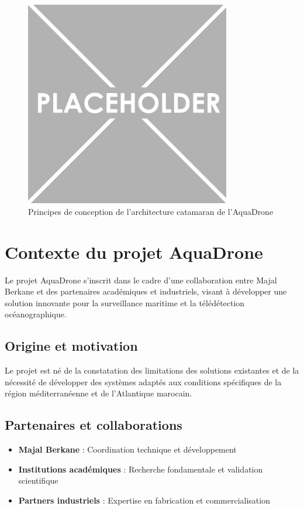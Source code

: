 {%
\begin{figure}[h]
    \centering
    \includegraphics[width=0.8\textwidth]{Figures/PezizaTuberosa.jpg}
    \caption{Principes de conception de l'architecture catamaran de l'AquaDrone}
    \label{fig:catamaran-design}
\end{figure}

\section{Contexte du projet AquaDrone}
Le projet AquaDrone s'inscrit dans le cadre d'une collaboration entre Majal Berkane et des partenaires académiques et industriels, visant à développer une solution innovante pour la surveillance maritime et la télédétection océanographique.

\subsection{Origine et motivation}
Le projet est né de la constatation des limitations des solutions existantes et de la nécessité de développer des systèmes adaptés aux conditions spécifiques de la région méditerranéenne et de l'Atlantique marocain.

\subsection{Partenaires et collaborations}
\begin{itemize}
    \item \textbf{Majal Berkane} : Coordination technique et développement
    \item \textbf{Institutions académiques} : Recherche fondamentale et validation scientifique
    \item \textbf{Partners industriels} : Expertise en fabrication et commercialisation
\end{itemize}

}
